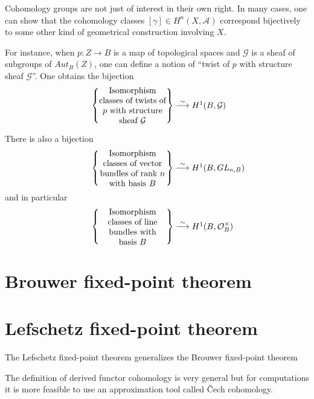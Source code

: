 Cohomology groups are not just of interest in their own right. In many cases, one can show that the cohomology classes $[\gamma] \in H^n(X, \mathcal{A})$ correspond bijectively to some other kind of geometrical construction involving $X$.

For instance, when $p:Z \to B$ is a map of topological spaces and $\mathcal{G}$  is a sheaf of subgroups of $Aut_B(Z)$, one can define a notion of “twist of $p$ with structure sheaf $\mathcal{G}$”. One obtains the bijection
\begin{align}
            \left\{ \parbox[c]{1.1in}{\centering
                       Isomorphism classes of twists of $p$
                       with structure sheaf $\mathcal{G}$}
            \right\}
            \stackrel{\sim}{\longrightarrow}
            \parbox[c]{0.5in}{\centering
                       $H^1(B, \mathcal{G})$}
\end{align}

There is also a bijection
\begin{align}
            \left\{ \parbox[c]{1.1in}{\centering
              Isomorphism classes of vector bundles of rank $n$ with basis $B$}
            \right\}
            \stackrel{\sim}{\longrightarrow}
            \parbox[c]{0.5in}{\centering
            $H^1(B, GL_{n,B})$}
\end{align}
and in particular
\begin{align}
            \left\{ \parbox[c]{1.1in}{\centering
            Isomorphism classes of line bundles with basis $B$}
            \right\}
            \stackrel{\sim}{\longrightarrow}
            \parbox[c]{0.5in}{\centering
                $H^1(B, \OO_B^\times)$}
\end{align}




\section{Brouwer fixed-point theorem}

\section{Lefschetz fixed-point theorem}

The Lefschetz fixed-point theorem generalizes the Brouwer fixed-point theorem

The definition of derived functor cohomology is very general but for computations it is more feasible to use an approximation tool called \v{C}ech cohomology.